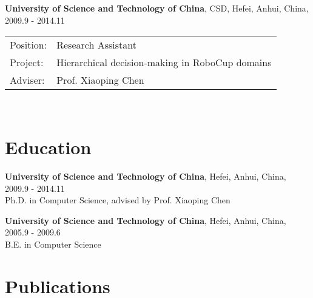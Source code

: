 \documentclass[letterpaper,10pt]{article}
\renewenvironment{itemize}{
  \begin{list}{}{
    \setlength{\leftmargin}{1.5em}
  }
}{
  \end{list}
}
\begin{document}
\begin{itemize}
	\item \textbf{University of Science and Technology of China}, CSD, Hefei, Anhui, China, 2009.9 - 2014.11 \\
	      \begin{tabular}{ll}
		      Position: & Research Assistant                              \\
		      Project:  & Hierarchical decision-making in RoboCup domains \\
		      Adviser:  & Prof. Xiaoping Chen                             \\
	      \end{tabular} \\
\end{itemize}

\vspace{10pt}
\section*{Education}
\begin{itemize}
	\item \textbf{University of Science and Technology of China}, Hefei, Anhui, China, 2009.9 - 2014.11 \\
	      Ph.D. in Computer Science, advised by Prof. Xiaoping Chen
	\item \textbf{University of Science and Technology of China}, Hefei, Anhui, China, 2005.9 - 2009.6 \\
	      B.E. in Computer Science
\end{itemize}


\vspace{10pt}
\section*{Publications}
\nocite{*}



\vspace{10pt}
\end{document}
